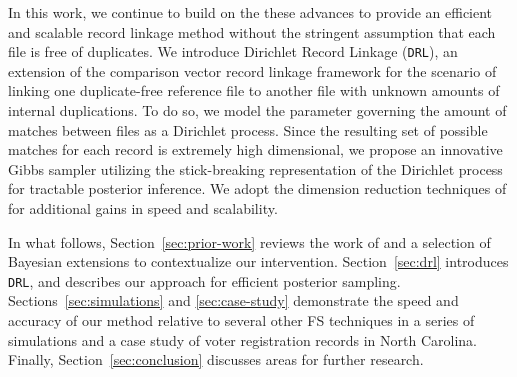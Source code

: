 \documentclass[12pt,letterpaper]{article}
\newcommand{\1}[1]{\mathbb{I}\!\left[#1\right]} %
\begin{document}
In this work, we continue to build on the these advances to provide an efficient and scalable record linkage method without the stringent assumption that each file is free of duplicates. We introduce Dirichlet Record Linkage (\texttt{DRL}), an extension of the comparison vector record linkage framework for the scenario of linking one duplicate-free reference file to another file with unknown amounts of internal duplications. To do so, we model the parameter governing the amount of matches between files as a Dirichlet process. Since the resulting set of possible matches for each record is extremely high dimensional, we propose an innovative Gibbs sampler utilizing the stick-breaking representation of the Dirichlet process for tractable posterior inference. We adopt the dimension reduction techniques of \cite{kundinger_2023} for additional gains in speed and scalability. 

In what follows, Section~\ref{sec:prior-work} reviews the work of \cite{fellegi_theory_1969} and a selection of Bayesian extensions to contextualize our intervention. Section~\ref{sec:drl} introduces \texttt{DRL}, and describes our approach for efficient posterior sampling. Sections~\ref{sec:simulations} and \ref{sec:case-study} demonstrate the speed and accuracy of our method relative to several other FS techniques in a series of simulations and a case study of voter registration records in North Carolina. Finally, Section~\ref{sec:conclusion} discusses areas for further research.


\end{document}
